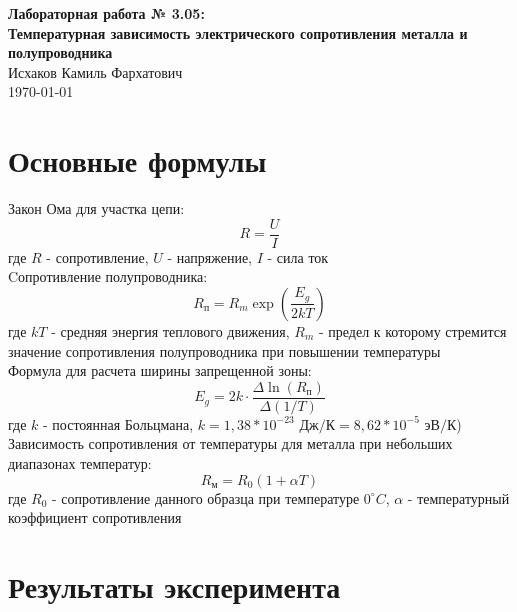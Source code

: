 \documentclass{article}%
\begin{document}
%
\normalsize%
\begin{center}%
\vspace*{\fill}%
{\LARGE\textbf{Лабораторная работа № 3.05: \\ Температурная зависимость электрического сопротивления металла и полупроводника}}\\[1cm]%
{\Large Исхаков Камиль Фархатович}\\[1cm]%
{\Large \today}%
\vspace*{\fill}%
\end{center}%
\newpage%
\section{Основные формулы}%
\label{sec:}%
Закон Ома для участка цепи:\begin{displaymath}R=\frac{U}{I}\end{displaymath}%
\newline%
где $R$ - сопротивление, $U$ - напряжение, $I$ -  сила ток\\%
Cопротивление полупроводника:\begin{displaymath}R_{\text{п}} = R_m\exp{(\frac{E_g}{2kT})}\end{displaymath}%
\newline%
где $kT$ - средняя энергия теплового движения, $R_m$ - предел к которому стремится значение сопротивления полупроводника при повышении температуры\\%
Формула для расчета ширины запрещенной зоны:\begin{displaymath}E_g=2k \cdot \frac{\Delta \ln({R_{\text{п}}})}{\Delta (1/T)}\end{displaymath}%
\newline%
где $k$ - постоянная Больцмана, $k=1,38*10^{-23} \textit{ Дж/К}=8,62*10^{-5}\textit{ эВ/К}$)\\%
Зависимость сопротивления от температуры для металла при небольших диапазонах температур:\begin{displaymath}R_{\text{м}} = R_0(1+\alpha T)\end{displaymath}%
\newline%
где $R_0$ - сопротивление данного образца при температуре $0^\circ C$, $\alpha$ - температурный коэффициент сопротивления\\

%
\section{Результаты эксперимента}%
\label{sec:}%
\end{document}
